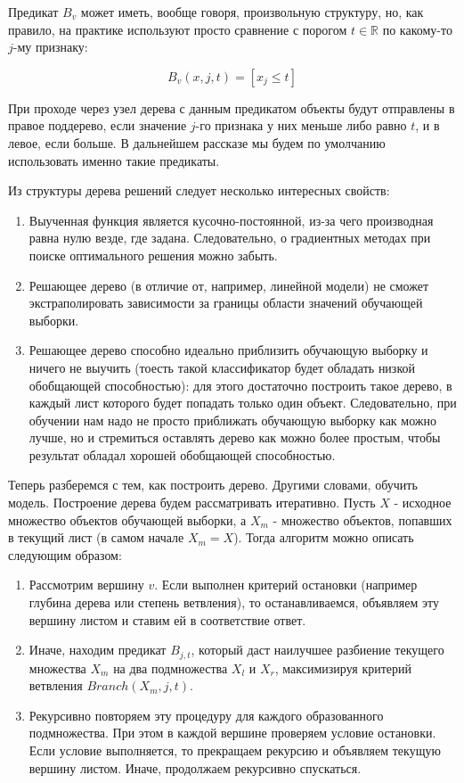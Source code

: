Предикат $B_v$ может иметь, вообще говоря, произвольную структуру, но, как правило, на практике используют просто сравнение с порогом $t \in \mathbb{R}$ по какому-то $j$-му признаку:

\[ B_v(x,j,t)=[x_j \leq t] \]

При проходе через узел дерева с данным предикатом объекты будут отправлены в правое поддерево, если значение $j$-го признака у них меньше либо равно $t$, и в левое, если больше. В дальнейшем рассказе мы будем по умолчанию использовать именно такие предикаты.

Из структуры дерева решений следует несколько интересных свойств:\cite{SHAD-trees}

\begin{enumerate}
    \item Выученная функция является кусочно-постоянной, из-за чего производная равна нулю везде, где задана. Следовательно, о градиентных методах при поиске оптимального решения можно забыть.
    \item Решающее дерево (в отличие от, например, линейной модели) не сможет экстраполировать зависимости за границы области значений обучающей выборки.
    \item Решающее дерево способно идеально приблизить обучающую выборку и ничего не выучить (тоесть такой классификатор будет обладать низкой обобщающей способностью): для этого достаточно построить такое дерево, в каждый лист которого будет попадать только один объект. Следовательно, при обучении нам надо не просто приближать обучающую выборку как можно лучше, но и стремиться оставлять дерево как можно более простым, чтобы результат обладал хорошей обобщающей способностью.
\end{enumerate}

Теперь разберемся с тем, как построить дерево. Другими словами, обучить модель. Построение дерева будем рассматривать итеративно. Пусть $X$ - исходное множество объектов обучающей выборки, а $X_m$ - множество объектов, попавших в текущий лист (в самом начале $X_m = X$). Тогда алгоритм можно описать следующим образом:

\begin{enumerate}
    \item Рассмотрим вершину $v$. Если выполнен критерий остановки (например глубина дерева или степень ветвления), то останавливаемся, объявляем эту вершину листом и ставим ей в соответствие ответ.
    \item Иначе, находим предикат $B_{j,t}$, который даст наилучшее разбиение текущего множества $X_m$ на два подмножества $X_l$ и $X_r$, максимизируя критерий ветвления $Branch(X_m,j,t)$.
    \item Рекурсивно повторяем эту процедуру для каждого образованного подмножества. При этом в каждой вершине проверяем условие остановки. Если условие выполняется, то прекращаем рекурсию и объявляем текущую вершину листом. Иначе, продолжаем рекурсивно спускаться.
\end{enumerate}

